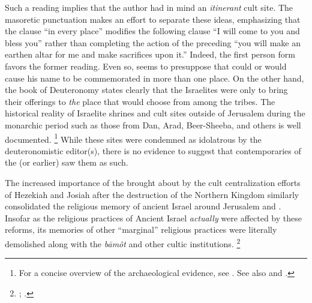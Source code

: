 Such a reading implies that the author had in mind an \emph{itinerant} cult site. The masoretic punctuation makes an effort to separate these ideas, emphasizing that the clause  ``in every place'' modifies the following clause  ``I will come to you and bless you'' rather than completing the action of the preceding  ``you will make an earthen altar for me and make sacrifices upon it.'' Indeed, the first person form  favors the former reading. Even so,  seems to presuppose that \yahweh could or would cause his name to be commemorated in more than one place. On the other hand, the book of Deuteronomy states clearly that the Israelites were only to bring their offerings to \emph{the} place that \yahweh would choose from among the tribes. The historical reality of Israelite shrines and cult sites outside of Jerusalem during the monarchic period such as those from Dan, Arad, Beer-Sheeba, and others is well documented.%
    \footnote{For a concise overview of the archaeological evidence, see \cite[319--352]{king-stager2001}. See also \cite{edelman_barton-stavrakopoulou2010} and \cite[160--181]{smith2002}.}
While these sites were condemned as idolatrous by the deuteronomistic editor(s), there is no evidence to suggest that contemporaries of the  (or earlier) saw them as such.

The increased importance of the \jerusalemtemple brought about by the cult centralization efforts of Hezekiah and Josiah after the destruction of the Northern Kingdom similarly consolidated the religious memory of ancient Israel around Jerusalem and \solomonstemple. Insofar as the religious practices of Ancient Israel \emph{actually} were affected by these reforms, its memories of other ``marginal'' religious practices were literally demolished along with the \emph{bāmôt} and other cultic institutions.%
    \footnote{\Cite[182--199]{smith2002}; \cite[191--209]{romer2015}.}

